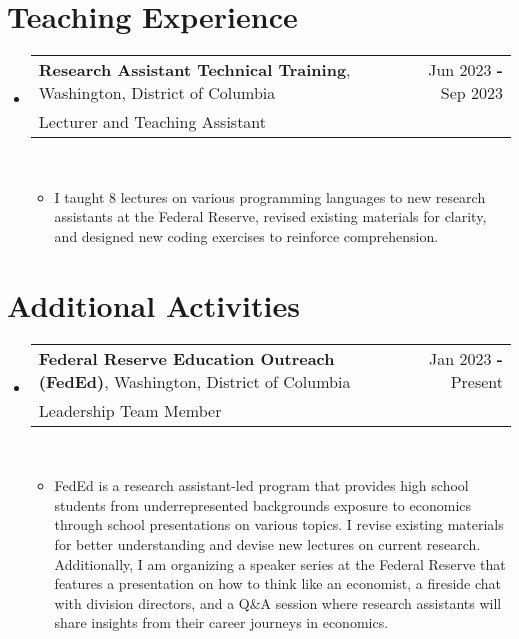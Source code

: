 \documentclass[letterpaper,11pt]{article}
\makeatletter
\newcommand{\Item}[1]{
  \item\small{
    {#1 \vspace{-2pt}}
  }
}
\newcommand{\Subheading}[4]{
  \vspace{-2pt}\item
    \begin{tabular*}{0.97\textwidth}[t]{l@{\extracolsep{\fill}}r}
      \textbf{#1}, #2 & #3 \\
      \small#4 \\
    \end{tabular*}\\
}
\newcommand{\SubHeadingListStart}{\begin{itemize}[leftmargin=0.15in, label={}]}
\newcommand{\SubHeadingListEnd}{\end{itemize}}
\newcommand{\ItemListStart}{\begin{itemize}}
\newcommand{\ItemListEnd}{\end{itemize}}
\makeatother
\begin{document}

\section{Teaching Experience}
  \SubHeadingListStart
    
    \Subheading
    {Research Assistant Technical Training}{Washington, District of Columbia}{Jun 2023 \textbf{-} Sep 2023}
    {Lecturer and Teaching Assistant}
      \vspace{-10pt}
      \ItemListStart
        \Item{I taught 8 lectures on various programming languages to 
        new research assistants at the Federal Reserve, revised existing 
        materials for clarity, and designed new coding exercises to reinforce 
        comprehension.}
      \ItemListEnd
  
  \SubHeadingListEnd




\section{Additional Activities}
  \SubHeadingListStart
    
    \Subheading
    {Federal Reserve Education Outreach (FedEd)}{Washington, District of 
    Columbia}{Jan 2023 \textbf{-} Present}
    {Leadership Team Member}
      \vspace{-10pt}
      \ItemListStart
        \Item{FedEd is a research assistant-led program that provides high 
          school students from underrepresented backgrounds exposure to 
          economics through school presentations on various topics. I revise 
          existing materials for better understanding and devise new lectures 
          on current research. Additionally, I am organizing a speaker series 
          at the Federal Reserve that features a presentation on how to think 
          like an economist, a fireside chat with division directors, and a 
          Q\&A session where research assistants will share insights from their 
          career journeys in economics.}
      \ItemListEnd

    \SubHeadingListEnd




\end{document}
